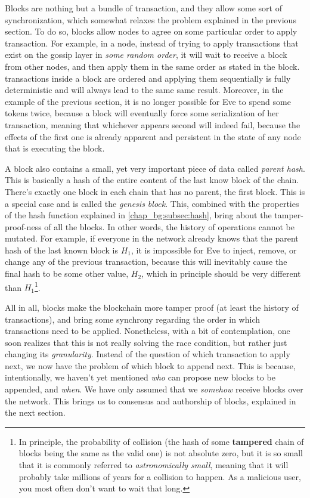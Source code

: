 Blocks are nothing but a bundle of transaction, and they allow some sort of synchronization, which
somewhat relaxes the problem explained in the previous section. To do so, blocks allow nodes to
agree on some particular order to apply transaction. For example, in a node, instead of trying to
apply transactions that exist on the gossip layer in \textit{some random order}, it will wait to
receive a block from other nodes, and then apply them in the same order as stated in the block.
transactions inside a block are ordered and applying them sequentially is fully deterministic and
will always lead to the same same result. Moreover, in the example of the previous section, it is no
longer possible for Eve to spend some tokens twice, because a block will eventually force some
serialization of her transaction, meaning that whichever appears second will indeed fail, because
the effects of the first one is already apparent and persistent in the state of any node that is
executing the block.

A block also contains a small, yet very important piece of data called \textit{parent hash}. This is
basically a hash of the entire content of the last know block of the chain. There's exactly one
block in each chain that has no parent, the first block. This is a special case and is called the
\textit{genesis block}. This, combined with the properties of the hash function explained in
\ref{chap_bg:subsec:hash}, bring about the tamper-proof-ness of all the blocks. In other words, the
history of operations cannot be mutated. For example, if everyone in the network already knows that
the parent hash of the last known block is $H_1$, it is impossible for Eve to inject, remove, or
change any of the previous transaction, because this will inevitably cause the final hash to be some
other value, $H_2$, which in principle should be very different than $H_1$\footnote{In principle,
the probability of collision (the hash of some \textbf{tampered} chain of blocks being the same as
the valid one) is not absolute zero, but it is so small that it is commonly referred to
\textit{astronomically small}, meaning that it will probably take millions of years for a collision
to happen. As a malicious user, you most often don't want to wait that long.}.

All in all, blocks make the blockchain more tamper proof (at least the history of transactions), and
bring some synchrony regarding the order in which transactions need to be applied. Nonetheless, with
a bit of contemplation, one soon realizes that this is not really solving the race condition, but
rather just changing its \textit{granularity}. Instead of the question of which transaction to apply
next, we now have the problem of which block to append next. This is because, intentionally, we
haven't yet mentioned \textit{who} can propose new blocks to be appended, and \textit{when}. We have
only assumed that we \textit{somehow} receive blocks over the network. This brings us to consensus
and authorship of blocks, explained in the next section.



